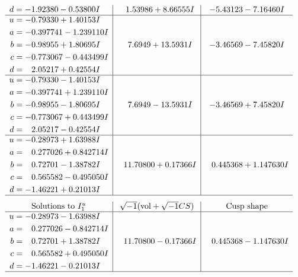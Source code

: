 \documentclass[1p]{elsarticle_modified}
\theoremstyle{definition}
\newcommand{\I}{\sqrt{-1}}
\begin{document}
$$\begin{array}{c|c|c}
\begin{aligned}
d &= -1.92380 - 0.53800 I\end{aligned}
 & \phantom{-}1.53986 + 8.66555 I & -5.43123 - 7.16460 I \\ \hline\begin{aligned}
u &= -0.79330 + 1.40153 I \\
a &= -0.397741 - 1.239110 I \\
b &= -0.98955 + 1.80695 I \\
c &= -0.773067 - 0.443499 I \\
d &= \phantom{-}2.05217 + 0.42554 I\end{aligned}
 & \phantom{-}7.6949 + 13.5931 I & -3.46569 - 7.45820 I \\ \hline\begin{aligned}
u &= -0.79330 - 1.40153 I \\
a &= -0.397741 + 1.239110 I \\
b &= -0.98955 - 1.80695 I \\
c &= -0.773067 + 0.443499 I \\
d &= \phantom{-}2.05217 - 0.42554 I\end{aligned}
 & \phantom{-}7.6949 - 13.5931 I & -3.46569 + 7.45820 I \\ \hline\begin{aligned}
u &= -0.28973 + 1.63988 I \\
a &= \phantom{-}0.277026 + 0.842714 I \\
b &= \phantom{-}0.72701 - 1.38782 I \\
c &= \phantom{-}0.565582 - 0.495050 I \\
d &= -1.46221 + 0.21013 I\end{aligned}
 & \phantom{-}11.70800 + 0.17366 I & \phantom{-}0.445368 + 1.147630 I\\
 \hline 
 \end{array}$$\newpage$$\begin{array}{c|c|c}  
\text{Solutions to }I^u_{1}& \I (\text{vol} + \sqrt{-1}CS) & \text{Cusp shape}\\
 \hline 
\begin{aligned}
u &= -0.28973 - 1.63988 I \\
a &= \phantom{-}0.277026 - 0.842714 I \\
b &= \phantom{-}0.72701 + 1.38782 I \\
c &= \phantom{-}0.565582 + 0.495050 I \\
d &= -1.46221 - 0.21013 I\end{aligned}
 & \phantom{-}11.70800 - 0.17366 I & \phantom{-}0.445368 - 1.147630 I\\
 \hline 
 \end{array}$$\newpage\newpage\renewcommand{\arraystretch}{1}
\end{document}
